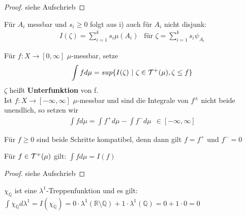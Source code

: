 \documentclass[11pt,a4paper,fleqn,openany]{report}
\begin{document}
    \begin{proof}
      siehe Aufschrieb
    \end{proof}

    \begin{remark}
      Für $A_i$ messbar und $s_i \geq 0$ folgt aus i) auch für $A_i$ nicht disjunk:
      \begin{align*}
        I(\zeta) = \sum\limits_{i=1}^k s_i \mu(A_i) \ \ \text{ für } \zeta = \sum\limits_{i=1}^k s_i \psi_{A_i}
      \end{align*}
    \end{remark}

    \begin{definition}
      Für $f: X \to [0,\infty]$ $\mu$-messbar, setze
      \begin{align*}
        \int f d\mu = sup\{I(\zeta) \ | \ \zeta \in \mathcal{T}^+(\mu), \zeta \leq f\}
      \end{align*}
      $\zeta$ heißt \textbf{Unterfunktion} von f.\\
      Ist $f: X \to [-\infty, \infty]$ $\mu$-messbar und sind die Integrale von $f^{\pm}$ nicht beide unendlich, so setzen wir
      \begin{align*}
        \int f d\mu = \int f^+ d\mu - \int f^- d\mu \ \ \in [-\infty, \infty] 
      \end{align*}
    \end{definition}

    \begin{remark}
      Für $f \geq 0$ sind beide Schritte kompatibel, denn dann gilt $f = f^+$ und $f^- = 0$
    \end{remark}

    \begin{lemma}
      Für $f \in \mathcal{T}^+(\mu)$ gilt: $\int f d\mu = I(f)$
    \end{lemma}

    \begin{proof}
      siehe Aufschrieb
    \end{proof}

    \begin{example}
      $\chi_{\mathbb{Q}}$ ist eine $\lambda^1$-Treppenfunktion und es gilt:\\
      $\int \chi_{\mathbb{Q}} d\lambda^1 = I(\chi_{\mathbb{Q}}) = 0 \cdot \lambda^1(\mathbb{R} \setminus \mathbb{Q}) + 1 \cdot \lambda^1(\mathbb{Q}) = 0 + 1 \cdot 0 = 0$
    \end{example}
\end{document}

